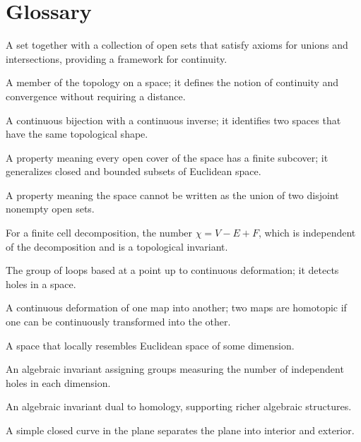 \section*{Glossary}
\begin{description}[leftmargin=*,style=nextline,itemsep=0.3em]
\item[\textbf{Topological space.}] A set together with a collection of open sets that satisfy axioms for unions and intersections, providing a framework for continuity.
\item[\textbf{Open set.}] A member of the topology on a space; it defines the notion of continuity and convergence without requiring a distance.
\item[\textbf{Homeomorphism.}] A continuous bijection with a continuous inverse; it identifies two spaces that have the same topological shape.
\item[\textbf{Compactness.}] A property meaning every open cover of the space has a finite subcover; it generalizes closed and bounded subsets of Euclidean space.
\item[\textbf{Connectedness.}] A property meaning the space cannot be written as the union of two disjoint nonempty open sets.
\item[\textbf{Euler characteristic.}] For a finite cell decomposition, the number $\chi = V - E + F$, which is independent of the decomposition and is a topological invariant.
\item[\textbf{Fundamental group.}] The group of loops based at a point up to continuous deformation; it detects holes in a space.
\item[\textbf{Homotopy.}] A continuous deformation of one map into another; two maps are homotopic if one can be continuously transformed into the other.
\item[\textbf{Manifold.}] A space that locally resembles Euclidean space of some dimension.
\item[\textbf{Homology.}] An algebraic invariant assigning groups measuring the number of independent holes in each dimension.
\item[\textbf{Cohomology.}] An algebraic invariant dual to homology, supporting richer algebraic structures.
\item[\textbf{Jordan curve theorem.}] A simple closed curve in the plane separates the plane into interior and exterior.
\end{description}
